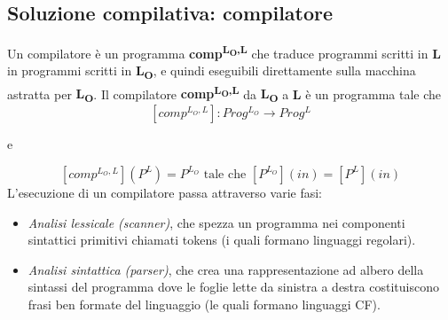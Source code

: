 \documentclass[a4paper,oneside,titlepage]{book}
\begin{document}
\subsection{Soluzione compilativa: compilatore}
Un compilatore è un programma \textbf{comp\textsuperscript{L\textsubscript{O},L}} che traduce programmi scritti in \textbf{L} in programmi scritti in \textbf{L\textsubscript{O}}, e quindi eseguibili direttamente sulla macchina astratta per \textbf{L\textsubscript{O}}. Il compilatore \textbf{comp\textsuperscript{L\textsubscript{O},L}} da \textbf{L\textsubscript{O}} a \textbf{L} è un programma tale che
\[ [comp^{L_{O},L}]: Prog^{L_{O}} \rightarrow Prog^{L} \]
\begin{center}
	e
\end{center}
\[ [comp^{L_{O},L}](P^{L}) = P^{L_{O}} \text{ tale che } [P^{L_{O}}](in) = [P^{L}](in) \]
L'esecuzione di un compilatore passa attraverso varie fasi:
\begin{itemize}
	\item \textit{Analisi lessicale (scanner)}, che spezza un programma nei componenti sintattici primitivi chiamati tokens (i quali formano linguaggi regolari).
	\item \textit{Analisi sintattica (parser)}, che crea una rappresentazione ad albero della sintassi del programma dove le foglie lette da sinistra a destra costituiscono frasi ben formate del linguaggio (le quali formano linguaggi CF).
\end{itemize}
\end{document}
